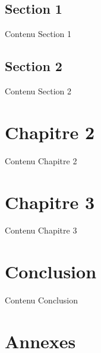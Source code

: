 \documentclass[a4paper,12pt]{report}
\begin{document}
	\section{Section 1}	
		Contenu Section 1
		
		\newpage
	
	\section{Section 2}
		Contenu Section 2
		
		\newpage
	
	\chapter{Chapitre 2} %
		Contenu Chapitre 2
		
		\newpage
	
	\chapter{Chapitre 3} %
		Contenu Chapitre 3
	
		\newpage
	
	\chapter*{Conclusion} %
		Contenu Conclusion

		\newpage
	
	\renewcommand\glossaryname{Glossaire}
	\printglossaries
	\newpage
	
	\nocite{*}		
	\newpage
	
	\listoffigures
	\newpage
	
	\chapter*{Annexes} %
	
	
	\tableofcontents
	\newpage
\end{document}
